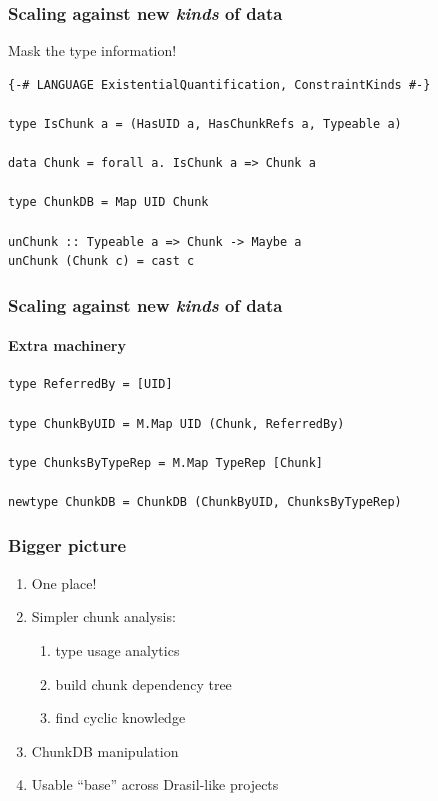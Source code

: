 \documentclass[xcolor={dvipsnames}]{beamer}
\begin{document}
\begin{frame}[fragile]
  \frametitle{Scaling against new \textit{kinds} of data}

  \begin{center}
    Mask the type information!
  \end{center}

\begin{verbatim}
{-# LANGUAGE ExistentialQuantification, ConstraintKinds #-}

type IsChunk a = (HasUID a, HasChunkRefs a, Typeable a)

data Chunk = forall a. IsChunk a => Chunk a

type ChunkDB = Map UID Chunk

unChunk :: Typeable a => Chunk -> Maybe a
unChunk (Chunk c) = cast c
\end{verbatim}
\end{frame}

\begin{frame}[fragile]
  \frametitle{Scaling against new \textit{kinds} of data}
  \framesubtitle{Extra machinery}

\begin{verbatim}
type ReferredBy = [UID]

type ChunkByUID = M.Map UID (Chunk, ReferredBy)

type ChunksByTypeRep = M.Map TypeRep [Chunk]

newtype ChunkDB = ChunkDB (ChunkByUID, ChunksByTypeRep)
\end{verbatim}
\end{frame}

\begin{frame}
  \frametitle{Bigger picture}

  \begin{enumerate}
    \item One place!
    \item Simpler chunk analysis:
      \begin{enumerate}
        \item type usage analytics
        \item build chunk dependency tree
        \item find cyclic knowledge
      \end{enumerate}
    \item ChunkDB manipulation
    \item Usable ``base'' across Drasil-like projects
  \end{enumerate}
\end{frame}
\end{document}
